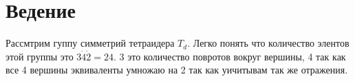 \section{Ведение}

Рассмтрим гуппу симметрий тетраидера $T_d$. Легко понять что количество элентов этой 
группы это $3\dot 4 \dot 2 = 24$. 3 это количество повротов вокруг вершины,
4 так как все 4 вершины эквиваленты умножаю на 2 так как уичитывам так же отражения.
